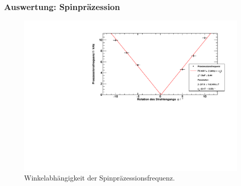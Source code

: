 \begin{frame}
\frametitle{Auswertung: Spinpräzession}

\begin{figure}
    \centering
    \includegraphics[width=\textwidth]{../img/winkel.pdf}
    \caption{Winkelabhängigkeit der Spinpräzessionsfrequenz.}  
\end{figure} 
  
\end{frame}
